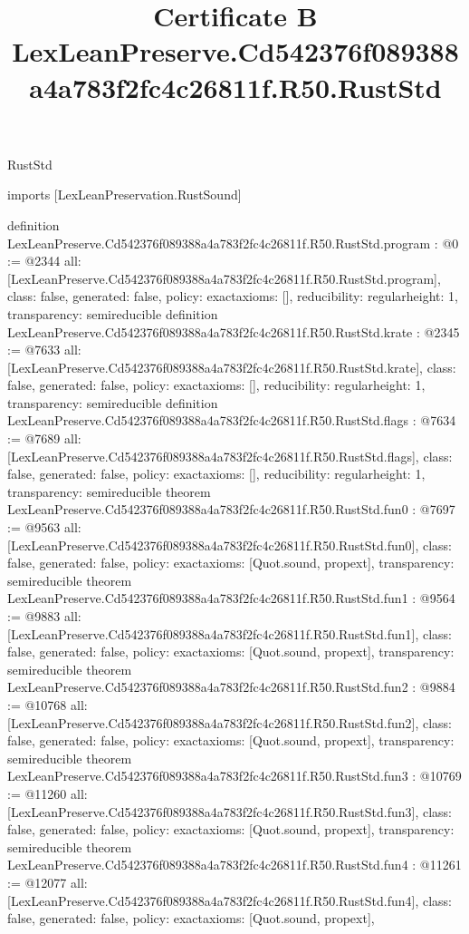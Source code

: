\begin{lexlean}{RustStd}
\title{Certificate B LexLeanPreserve.Cd542376f089388a4a783f2fc4c26811f.R50.RustStd}
\begin{coremodule}
imports [LexLeanPreservation.RustSound]

definition LexLeanPreserve.Cd542376f089388a4a783f2fc4c26811f.R50.RustStd.program : @0 := @2344 {
  all: [LexLeanPreserve.Cd542376f089388a4a783f2fc4c26811f.R50.RustStd.program],
  class: false,
  generated: false,
  policy: exact{axioms: []},
  reducibility: regular{height: 1},
  transparency: semireducible
}
definition LexLeanPreserve.Cd542376f089388a4a783f2fc4c26811f.R50.RustStd.krate : @2345 := @7633 {
  all: [LexLeanPreserve.Cd542376f089388a4a783f2fc4c26811f.R50.RustStd.krate],
  class: false,
  generated: false,
  policy: exact{axioms: []},
  reducibility: regular{height: 1},
  transparency: semireducible
}
definition LexLeanPreserve.Cd542376f089388a4a783f2fc4c26811f.R50.RustStd.flags : @7634 := @7689 {
  all: [LexLeanPreserve.Cd542376f089388a4a783f2fc4c26811f.R50.RustStd.flags],
  class: false,
  generated: false,
  policy: exact{axioms: []},
  reducibility: regular{height: 1},
  transparency: semireducible
}
theorem LexLeanPreserve.Cd542376f089388a4a783f2fc4c26811f.R50.RustStd.fun0 : @7697 := @9563 {
  all: [LexLeanPreserve.Cd542376f089388a4a783f2fc4c26811f.R50.RustStd.fun0],
  class: false,
  generated: false,
  policy: exact{axioms: [Quot.sound, propext]},
  transparency: semireducible
}
theorem LexLeanPreserve.Cd542376f089388a4a783f2fc4c26811f.R50.RustStd.fun1 : @9564 := @9883 {
  all: [LexLeanPreserve.Cd542376f089388a4a783f2fc4c26811f.R50.RustStd.fun1],
  class: false,
  generated: false,
  policy: exact{axioms: [Quot.sound, propext]},
  transparency: semireducible
}
theorem LexLeanPreserve.Cd542376f089388a4a783f2fc4c26811f.R50.RustStd.fun2 : @9884 := @10768 {
  all: [LexLeanPreserve.Cd542376f089388a4a783f2fc4c26811f.R50.RustStd.fun2],
  class: false,
  generated: false,
  policy: exact{axioms: [Quot.sound, propext]},
  transparency: semireducible
}
theorem LexLeanPreserve.Cd542376f089388a4a783f2fc4c26811f.R50.RustStd.fun3 : @10769 := @11260 {
  all: [LexLeanPreserve.Cd542376f089388a4a783f2fc4c26811f.R50.RustStd.fun3],
  class: false,
  generated: false,
  policy: exact{axioms: [Quot.sound, propext]},
  transparency: semireducible
}
theorem LexLeanPreserve.Cd542376f089388a4a783f2fc4c26811f.R50.RustStd.fun4 : @11261 := @12077 {
  all: [LexLeanPreserve.Cd542376f089388a4a783f2fc4c26811f.R50.RustStd.fun4],
  class: false,
  generated: false,
  policy: exact{axioms: [Quot.sound, propext]},
}
\end{coremodule}
\end{lexlean}
